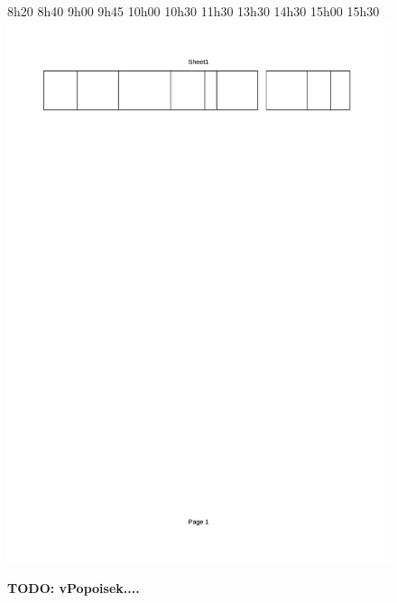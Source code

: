 \begin{figure}
	\footnotesize
	8h20 \hspace{4mm} 8h40 \hspace{10mm} 9h00 \hspace{14mm} 9h45 \hspace{3mm} 10h00 \hspace{-1mm}     10h30 \hspace{1mm} 11h30 \hspace{0mm}
	13h30 \hspace{4mm}14h30 \hspace{0mm}15h00 \hspace{0mm}15h30 \\
	\includegraphics[trim=15mm 245mm 15mm 25mm, clip=true, width=\linewidth]{tabRozvrh1.pdf}
	\caption{\textbf{TODO: vPopoisek....}}
\end{figure}